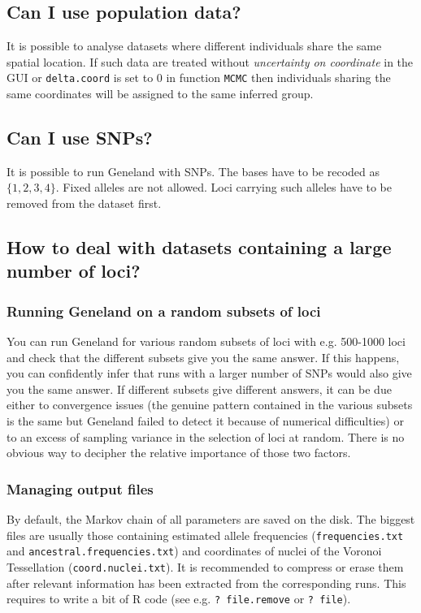 \documentclass[a4paper,10pt]{article}
\begin{document}
\subsection{Can I use population data?}
It is possible to analyse datasets where different individuals share the same spatial location. 
If such data are treated without {\em uncertainty on coordinate } in the GUI or {\tt delta.coord} is set to 0 in function {\tt MCMC} 
then individuals sharing the same coordinates will be assigned to the same inferred group. 

\subsection{Can I use SNPs?}\label{sec:faq_SNPSs} 
It is possible to run {\sc Geneland} with SNPs. The bases have to be recoded as $\{1,2,3,4\}$.
Fixed alleles are not allowed. Loci carrying such alleles have to be removed from 
the dataset first. 

\subsection[Large number of loci]{How to deal with datasets containing a large number of loci?}
\subsubsection{Running {\sc Geneland} on a random subsets of loci}
You can run {\sc Geneland} for various random subsets of loci with e.g. 500-1000 loci and check that 
the different subsets give you the same answer. 
If this happens, you can confidently infer that runs with a larger number of SNPs would also give you the same answer. 
If different subsets give different answers, it can be due either to convergence issues (the genuine pattern contained in 
the various subsets is the same but {\sc Geneland} failed to detect it because of numerical difficulties) or 
to an excess of sampling variance in the selection of loci at random. There is no obvious way 
to decipher the relative importance of those two factors. 


\subsubsection{Managing output files}
By default, the Markov chain of all parameters are saved on the disk. The biggest files are usually those containing estimated allele 
frequencies (\texttt{frequencies.txt} and \texttt{ancestral.frequencies.txt}) and coordinates of nuclei of the Voronoi Tessellation 
(\texttt{coord.nuclei.txt}). It is recommended to compress or erase them after relevant information has been extracted from 
the corresponding runs. This requires to write a bit of R code  (see e.g. {\tt ? file.remove} or {\tt ? file}).
\end{document}
